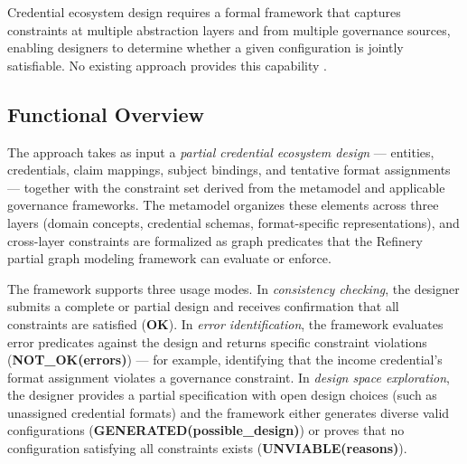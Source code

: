 
Credential ecosystem design requires a formal framework that captures constraints at multiple abstraction layers and from multiple governance sources, enabling designers to determine whether a given configuration is jointly satisfiable. No existing approach provides this capability .

\subsection{Functional Overview}\label{functional-overview}


The approach takes as input a \emph{partial credential ecosystem design} --- entities, credentials, claim mappings, subject bindings, and tentative format assignments --- together with the constraint set derived from the metamodel and applicable governance frameworks. The metamodel organizes these elements across three layers (domain concepts, credential schemas, format-specific representations), and cross-layer constraints are formalized as graph predicates that the Refinery partial graph modeling framework  can evaluate or enforce.

The framework supports three usage modes. In \emph{consistency checking}, the designer submits a complete or partial design and receives confirmation that all constraints are satisfied (\textbf{OK}). In \emph{error identification}, the framework evaluates error predicates against the design and returns specific constraint violations (\textbf{NOT\_OK(errors)}) --- for example, identifying that the income credential's format assignment violates a governance constraint. In \emph{design space exploration}, the designer provides a partial specification with open design choices (such as unassigned credential formats) and the framework either generates diverse valid configurations (\textbf{GENERATED(possible\_design)}) or proves that no configuration satisfying all constraints exists (\textbf{UNVIABLE(reasons)}).

